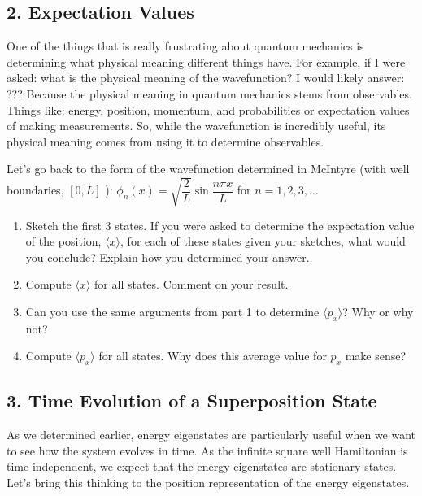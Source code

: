\documentclass[
]{article}
\providecommand{\tightlist}{%
  \setlength{\itemsep}{0pt}\setlength{\parskip}{0pt}}
\providecommand{\tightlist}{%
  \setlength{\itemsep}{0pt}\setlength{\parskip}{0pt}}
\begin{document}
\hypertarget{expectation-values}{%
\subsection{2. Expectation Values}\label{expectation-values}}

One of the things that is really frustrating about quantum mechanics is
determining what physical meaning different things have. For example, if
I were asked: what is the physical meaning of the wavefunction? I would
likely answer: ??? Because the physical meaning in
quantum mechanics stems from observables. Things like: energy, position,
momentum, and probabilities or expectation values of making
measurements. So, while the wavefunction is incredibly useful, its
physical meaning comes from using it to determine observables.

Let's go back to the form of the wavefunction determined in McIntyre
(with well boundaries, \([0,L]\) ):
\(\phi_n(x) = \sqrt{\dfrac{2}{L}} \sin \dfrac{n\pi x}{L}\) for
\(n = 1,2,3,\dots\)

\begin{enumerate}
\def\labelenumi{\arabic{enumi}.}
\tightlist
\item
  Sketch the first 3 states. If you were asked to determine the
  expectation value of the position, \(\langle x \rangle\), for each of
  these states given your sketches, what would you conclude? Explain how
  you determined your answer.
\item
  Compute \(\langle x \rangle\) for all states. Comment on your result.
\item
  Can you use the same arguments from part 1 to determine
  \(\langle p_x \rangle\)? Why or why not?
\item
  Compute \(\langle p_x \rangle\) for all states. Why does this average
  value for \(p_x\) make sense?
\end{enumerate}

\hypertarget{time-evolution-of-a-superposition-state}{%
\subsection{3. Time Evolution of a Superposition
State}\label{time-evolution-of-a-superposition-state}}

As we determined earlier, energy eigenstates are particularly useful
when we want to see how the system evolves in time. As the infinite
square well Hamiltonian is time independent, we expect that the energy
eigenstates are stationary states. Let's bring this thinking to the
position representation of the energy eigenstates.
\end{document}
